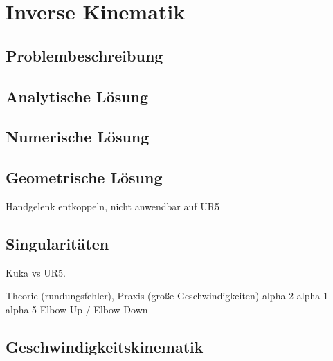 \cleardoublepage


\chapter{Inverse Kinematik}


\section{Problembeschreibung}


\section{Analytische Lösung}


\section{Numerische Lösung}


\section{Geometrische Lösung}

Handgelenk entkoppeln, nicht anwendbar auf UR5


\section{Singularitäten}\label{sec:singularitaten}


Kuka vs UR5.

Theorie (rundungsfehler), Praxis (große Geschwindigkeiten)
alpha-2
alpha-1
alpha-5
Elbow-Up / Elbow-Down


\section{Geschwindigkeitskinematik}